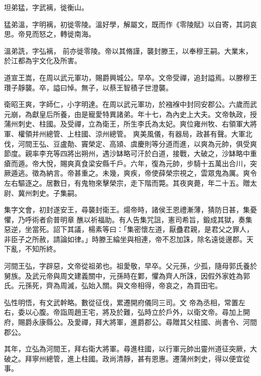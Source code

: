 \begin{pinyinscope}
 坦弟猛，字武褵，徙衡山。



 猛弟溫，字明褵，初徙零陵。溫好學，解屬文，既而作《零陵賦》以自寄，其詞哀思。帝見而怒之，轉徙南海。



 溫弟詵，字弘褵，
 前亦徙零陵。帝以其脩謹，襲封滕王，以奉穆王嗣。大業末，於江都為宇文化及所害。



 道宣王嵩，在周以武元軍功，賜爵興城公。早卒。文帝受禪，追封謚焉。以滕穆王瓚子靜襲。卒，謚曰悼。無子，以蔡王智積子世澄襲。



 衛昭王爽，字師仁，小字明達。在周以武元軍功，於襁褓中封同安郡公。六歲而武元崩，為獻皇后所養，由是寵愛特異諸弟。年十七，為內史上大夫。文帝執政，授蒲州刺史、柱國。及受禪，立為衛王，所生李氏為太妃。爽位雍州牧、右領軍大將軍、權領并州總管、上柱國、涼州總管。
 爽美風儀，有器局，政甚有聲。大軍北伐，河間王弘、豆盧勣、竇榮定、高熲、虞慶則等分道而進，以爽為元帥，俱受爽節度。親率李充等四將出朔州，遇沙缽略可汗於白道，接戰，大破之，沙缽略中重瘡而遁。帝大悅，賜爽真食梁安縣千戶。六年，復為元帥，步騎十五萬出合川，突厥遁逃。徵為納言。帝甚重之。未幾，爽疾，帝使薛榮宗視之，雲眾鬼為厲。爽令左右驅逐之。居數日，有鬼物來擊榮宗，走下階而斃。其夜爽薨，年二十五。贈太尉、冀州刺史。子集嗣。



 集字文會，初封遂安王，尋襲封衛王。煬帝時，諸侯王恩禮漸薄，猜防日甚，集憂懼，乃呼術者俞普明章
 醮以祈福助。有人告集咒詛，憲司希旨，鍛成其獄，奏集惡逆，坐當死。詔下其議，楊素等曰：「集密懷左道，厭蠱君親，是君父之罪人，非臣子之所赦，請論如律。」時滕王綸坐與相連，帝不忍加誅，除名遠徙邊郡。天下亂，不知所終。



 河間王弘，字辟惡，文帝從祖弟也。祖愛敬，早卒。父元孫，少孤，隨母郭氏養於舅族。及武元帝與周文建義關中，元孫時在鄴，懼為齊人所誅，因假外家姓為郭氏。元孫死，齊為周滅，弘始入關。與文帝相得，帝哀之，為買田宅。



 弘性明悟，有文武幹略。數從征伐，累遷開府儀同三司。文
 帝為丞相，常置左右，委以心腹。帝詣周趙王宅，將及於難，弘時立於戶外，以衛文帝。尋加上開府，賜爵永康縣公。及愛禪，拜大將軍，進爵郡公。尋贈其父柱國、尚書令、河間郡公。



 其年，立弘為河間王，拜右衛大將軍。尋進柱國，以行軍元帥出靈州道征突厥，大破之。拜寧州總管，進上柱國。政尚清靜，甚有恩惠。遷蒲州刺史，得以便宜從事。




\end{pinyinscope}
